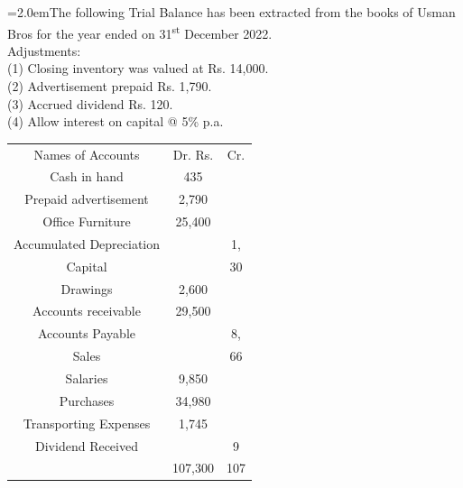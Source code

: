 \documentclass[11pt,a4paper]{article}
\newcommand{\lqn}[2]{\Needspace{6\baselineskip}\par\medskip\noindent\hangindent=2.0em\hangafter=1\makebox[2.0em][l]{\textbf{#1.}}#2\par}
\begin{document}
\lqn{112}{The following Trial Balance has been extracted from the books of Usman Bros for the year ended on 31\textsuperscript{st} December 2022.\\
Adjustments:\\
(1) Closing inventory was valued at Rs. 14,000.\\
(2) Advertisement prepaid Rs. 1,790.\\
(3) Accrued dividend Rs. 120.\\
(4) Allow interest on capital @ 5\% p.a.\par
\par\smallskip\noindent\hspace*{1.2em}\begin{tabular}{|ccc|}
\hline
Names of Accounts & Dr. Rs. & Cr. \\
Cash in hand & 435 &  \\
Prepaid advertisement & 2,790 &  \\
Office Furniture & 25,400 &  \\
Accumulated Depreciation &  & 1, \\
Capital &  & 30 \\
Drawings & 2,600 &  \\
Accounts receivable & 29,500 &  \\
Accounts Payable &  & 8, \\
Sales &  & 66 \\
Salaries & 9,850 &  \\
Purchases & 34,980 &  \\
Transporting Expenses & 1,745 &  \\
Dividend Received &  & 9 \\
 & 107,300 & 107 \\
\hline
\end{tabular}\par\smallskip
}
\end{document}

